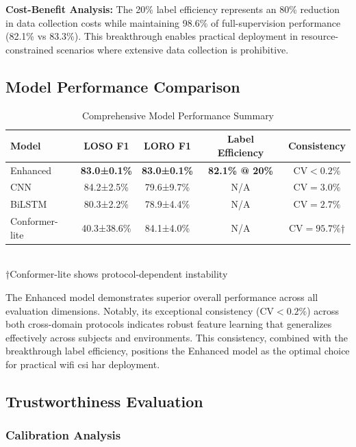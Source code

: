 \documentclass[journal]{IEEEtran}
\begin{document}
\textbf{Cost-Benefit Analysis:} The 20\% label efficiency represents an 80\% reduction in data collection costs while maintaining 98.6\% of full-supervision performance (82.1\% vs 83.3\%). This breakthrough enables practical deployment in resource-constrained scenarios where extensive data collection is prohibitive.

\subsection{Model Performance Comparison}

\begin{table}[ht]
\centering
\caption{Comprehensive Model Performance Summary}
\begin{tabular}{@{}lcccc@{}}
\toprule
Model & LOSO F1 & LORO F1 & Label Efficiency & Consistency \\
\midrule
Enhanced & \textbf{83.0±0.1\%} & \textbf{83.0±0.1\%} & \textbf{82.1\% @ 20\%} & \textbf{$\text{CV}<0.2\%$} \\
CNN & 84.2±2.5\% & 79.6±9.7\% & N/A & $\text{CV}=3.0\%$ \\
BiLSTM & 80.3±2.2\% & 78.9±4.4\% & N/A & $\text{CV}=2.7\%$ \\
Conformer-lite & 40.3±38.6\% & 84.1±4.0\% & N/A & $\text{CV}=95.7\%$† \\
\bottomrule
\end{tabular}\\
\footnotesize{†Conformer-lite shows protocol-dependent instability}
\label{tab:model_performance}
\end{table}

The Enhanced model demonstrates superior overall performance across all evaluation dimensions. Notably, its exceptional consistency ($\text{CV}<0.2\%$) across both cross-domain protocols indicates robust feature learning that generalizes effectively across subjects and environments. This consistency, combined with the breakthrough label efficiency, positions the Enhanced model as the optimal choice for practical \gls{wifi} \gls{csi} \gls{har} deployment.

\subsection{Trustworthiness Evaluation}

\subsubsection{Calibration Analysis}
\end{document}
